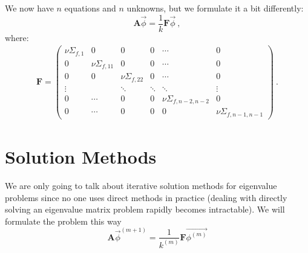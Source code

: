 \documentclass[12pt]{article}
\newcommand{\ve}[1]{\ensuremath{\mathbf{#1}}}
\begin{document}
We now have $n$ equations and $n$ unknowns, but we formulate it a bit differently: 
\[\ve{A}\vec{\phi} = \frac{1}{k}\ve{F}\vec{\phi}\:,\]
where:
\begin{align}
%
\ve{F} = \begin{pmatrix}
\nu\Sigma_{f,1} & 0 & 0 & 0 & \cdots & 0 \\
0   & \nu\Sigma_{f,11} & 0  & 0 & \cdots & 0 \\
0   & 0 & \nu\Sigma_{f,22}  & 0 & \cdots & 0 \\
\vdots  &     & \ddots  & \ddots & \ddots  & \vdots \\
0 & \cdots & 0 & 0 & \nu\Sigma_{f,n-2,n-2} & 0 \\
0        & \cdots & 0 & 0   & 0 & \nu\Sigma_{f,n-1,n-1} 
\end{pmatrix} \:.\nonumber
\end{align}


\section*{Solution Methods}

We are only going to talk about iterative solution methods for eigenvalue problems since no one uses direct methods in practice (dealing with directly solving an eigenvalue matrix problem rapidly becomes intractable). We will formulate the problem this way
%
\[ \ve{A} \vec{\phi}^{(m+1)} = \frac{1}{k^{(m)}}\ve{F}\vec{\phi^{(m)}}\]
\end{document}
